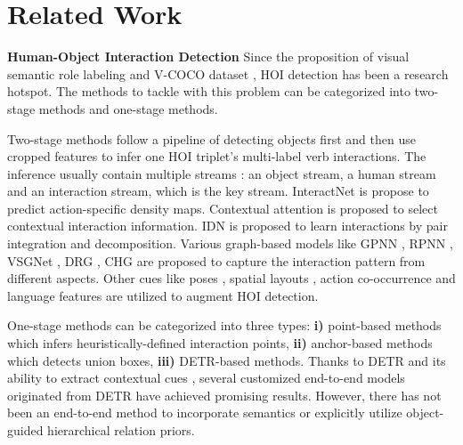 \documentclass[letterpaper]{article} %
\begin{document}
\section{Related Work}

\noindent\textbf{Human-Object Interaction Detection} Since the proposition of visual semantic role labeling and V-COCO dataset \cite{gupta2015VisualSemanticRole}, HOI detection has been a research hotspot. The methods to tackle with this problem can be categorized into two-stage methods and one-stage methods. 

Two-stage methods follow a pipeline of detecting objects first and then use cropped features to infer one HOI triplet's multi-label verb interactions. The inference usually contain multiple streams \cite{chao2018learningtodetectHOI}: an object stream, a human stream and an interaction stream, which is the key stream. InteractNet \cite{kaiming18DetectHOI} is propose to predict action-specific density maps. Contextual attention \cite{wang2019deepcontextual} is proposed to select contextual interaction information. IDN \cite{li2020hoianalysis} is proposed to learn interactions by pair integration and decomposition. Various graph-based models like GPNN \cite{Qi2018GPNN}, RPNN \cite{Zhou2019RPNN}, VSGNet \cite{ulutan2020VSGNet}, DRG \cite{gao2020DRG}, CHG \cite{wang2020CHG} are proposed to capture the interaction pattern from different aspects. Other cues like poses \cite{gupta2019nofrills,li2019interactiveness}, spatial layouts \cite{gao2018ican}, action co-occurrence \cite{kim2020actioncooccur} and language features \cite{liu2020FCMFNet,xu2019HOIwithknowledge,peyre2019HOIwithanalogy,zhong2020polysemy} are utilized to augment HOI detection.



One-stage methods can be categorized into three types: \textbf{i)} point-based methods \cite{liao2020ppdm,zhong2021GGNet} which infers heuristically-defined interaction points, \textbf{ii)} anchor-based methods \cite{kim2020uniondet} which detects union boxes, \textbf{iii)} DETR-based \cite{carion2020DETR} methods. Thanks to DETR and its ability to extract contextual cues \cite{AttentionAlluNeed}, several customized end-to-end models \cite{kim2021hotr,zou2021HOITransformer,chen2021ASNet,tamura2021qpic} originated from DETR have achieved promising results. However, there has not been an end-to-end method to incorporate semantics or explicitly utilize object-guided 
hierarchical relation priors.
\end{document}

